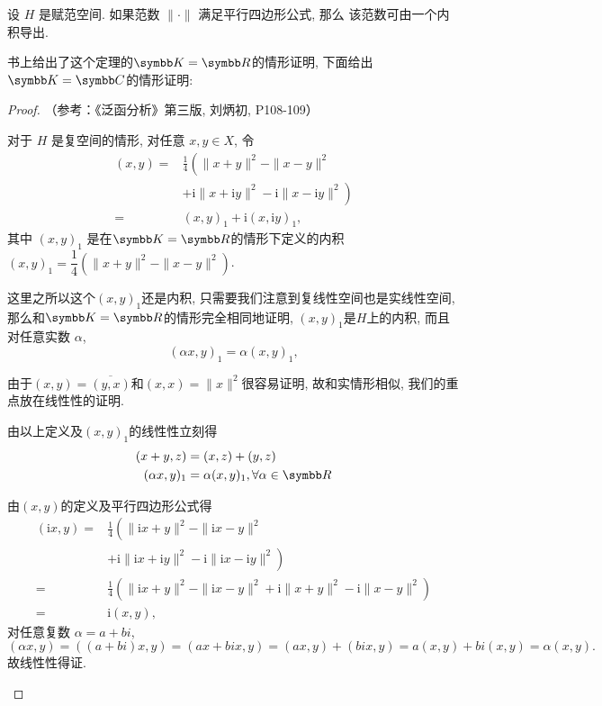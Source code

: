 \begin{theorem}[定理 4.1.12]
    设 $H$ 是赋范空间. 如果范数 $\|\cdot\|$ 满足平行四边形公式, 那么 该范数可由一个内积导出.
\end{theorem}
书上给出了这个定理的$\K=\R$的情形证明, 下面给出$\K=\C$的情形证明:
\begin{proof}（参考：《泛函分析》第三版, 刘炳初, P108-109）
    \begin{step}
        \item 对于 $H$ 是复空间的情形, 对任意 $x, y \in X$, 令
        \[
        \begin{aligned}
        (x, y)=& \frac{1}{4}\left(\|x+y\|^{2}-\|x-y\|^{2}\right.\\
        &\left.+\mathrm{i}\|x+\mathrm{i} y\|^{2}-\mathrm{i}\|x-\mathrm{i} y\|^{2}\right) \\
        =&(x, y)_{1}+\mathrm{i}(x, \mathrm{i} y)_{1},
        \end{aligned}
        \]
        其中 $(x, y)_{1}$ 是在$\K=\R$的情形下定义的内积$(x, y)_1= \dfrac{1}{4}(\|x+y\|^{2}-\|x-y\|^{2}) $. 
        \begin{remark}
            这里之所以这个$(x, y)_{1}$还是内积, 只需要我们注意到复线性空间也是实线性空间, 那么和$\K=\R$的情形完全相同地证明, $(x, y)_{1}$是$H$上的内积, 而且对任意实数 $\alpha$,
            \[
            (\alpha x, y)_1=\alpha(x, y)_1,
            \]
        \end{remark}
        由于$(x, y)=\overline{(y, x)}$和$(x, x)=\|x\|^{2}$很容易证明, 故和实情形相似, 我们的重点放在线性性的证明.
        \item 由以上定义及$(x, y)_1$的线性性立刻得
        \begin{align*}
            (x+y, z)&=(x, z)+(y, z)\\
            (\alpha x, y)_1&=\alpha(x, y)_1, \forall \alpha \in \R
        \end{align*}
        
        \item 由$(x,y)$的定义及平行四边形公式得
        \[
        \begin{aligned}
        (\mathrm{i} x, y)=& \frac{1}{4}\left(\|\mathrm{i} x+y\|^{2}-\|\mathrm{i} x-y\|^{2}\right.\\
        &\left.+\mathrm{i}\|\mathrm{i} x+\mathrm{i} y\|^{2}-\mathrm{i}\|\mathrm{i} x-\mathrm{i} y\|^{2}\right) \\
        =& \frac{1}{4}\left(\|\mathrm{i} x+y\|^{2}-\|\mathrm{i} x-y\|^{2}+\mathrm{i}\|x+y\|^{2}-\mathrm{i}\|x-y\|^{2}\right) \\
        =& \mathrm{i}(x, y),
        \end{aligned}
        \]
        对任意复数 $\alpha=a+bi$,
        \[
        (\alpha x, y)=((a+bi)x,y)=(ax+bix,y)=(ax,y)+(bix,y)=a(x,y)+bi(x,y)=\alpha(x, y) .
        \]
        故线性性得证.\qedhere
    \end{step}
\end{proof}